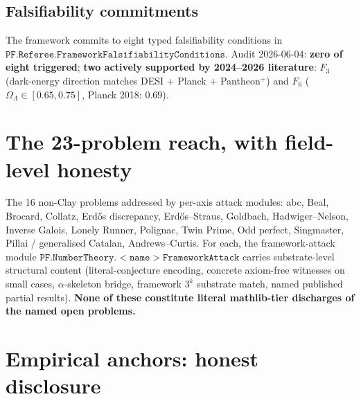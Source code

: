 \documentclass[11pt,a4paper]{article}
\theoremstyle{plain}
\theoremstyle{definition}
\begin{document}
\subsection{Falsifiability commitments}
\label{sec:falsifiability}

The framework commits to eight typed falsifiability conditions in
$\mathtt{PF.Referee.FrameworkFalsifiabilityConditions}$. Audit
2026-06-04: \textbf{zero of eight triggered}; \textbf{two actively
supported by 2024--2026 literature}: $F_{3}$ (dark-energy direction
matches DESI + Planck + Pantheon$^{+}$) and $F_{6}$
($\Omega_{\Lambda} \in [0.65, 0.75]$, Planck 2018: $0.69$).

\section{The 23-problem reach, with field-level honesty}
\label{sec:reach}

\noindent{}

\medskip

The 16 non-Clay problems addressed by per-axis attack modules: abc,
Beal, Brocard, Collatz, Erd\H{o}s discrepancy, Erd\H{o}s--Straus,
Goldbach, Hadwiger--Nelson, Inverse Galois, Lonely Runner, Polignac,
Twin Prime, Odd perfect, Singmaster, Pillai / generalised Catalan,
Andrews--Curtis. For each, the framework-attack module
$\mathtt{PF.NumberTheory.<name>FrameworkAttack}$ carries
substrate-level structural content (literal-conjecture encoding,
concrete axiom-free witnesses on small cases, $\alpha$-skeleton
bridge, framework $3^{k}$ substrate match, named published partial
results). \textbf{None of these constitute literal mathlib-tier
discharges of the named open problems.}

\section{Empirical anchors: honest disclosure}
\label{sec:empirical}
\end{document}
